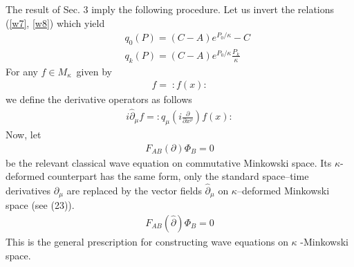 \documentclass[a4paper,a4paper]{article}
\begin{document}
The result of Sec.
 3 imply the following procedure.
Let us invert the relations
 (\ref{w7}, \ref{w8})
 which yield
\begin{eqnarray}\label{wz27}
&&q_{0}(P)=(C-A)e^{P_{0}/\kappa}-C  \nonumber \\
&&q_{k}(P)=(C-A)e^{P_{0}/\kappa}\frac{P_{k}}{\kappa}
\end{eqnarray}
For any $f\in M_{\kappa}$\ given by
\begin{eqnarray}\label{wz28}
f=\;:f(x):
\end{eqnarray}
we define the derivative operators as follows
\begin{eqnarray}\label{wz29}
i\hat{\partial}_{\mu}f=:q_{\mu}(i\frac{\partial}
{\partial x^{\nu}})f(x):
\end{eqnarray}
Now, let
\begin{eqnarray}\label{wz30}
F_{AB}(\partial )\Phi_{B} =0
\end{eqnarray}
be the relevant classical wave equation on commutative Minkowski
space. Its $\kappa$-deformed counterpart has the same form, only
the standard space--time derivatives $\partial_{\mu}$ are
replaced by the vector fields $\widehat{\partial}_{\mu}$ on
$\kappa$--deformed Minkowski space (see (23)).
\begin{eqnarray}\label{wz31}
F_{AB}(\hat{\partial })\Phi_{B} =0
\end{eqnarray}
This is the general prescription for constructing wave equations on
$\kappa$%
-Minkowski space.
\end{document}
